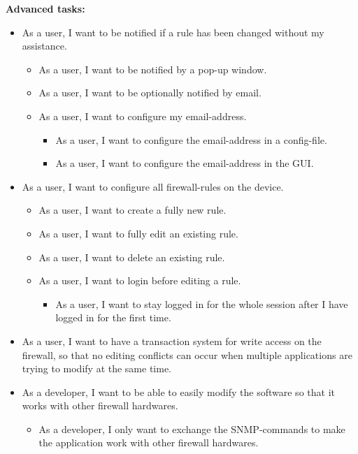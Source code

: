 \documentclass[11pt, a4paper]{article}
\begin{document}
 \textbf{Advanced tasks:}
\begin{itemize}
\item As a user, I want to be notified if a rule has been changed without my assistance.
\begin{itemize}
\item As a user, I want to be notified by a pop-up window.
\item As a user, I want to be optionally notified by email.
\item As a user, I want to configure my email-address.
\begin{itemize}
\item As a user, I want to configure the email-address in a config-file.
\item As a user, I want to configure the email-address in the GUI.
\end{itemize}
\end{itemize}
\item As a user, I want to configure all firewall-rules on the device.
\begin{itemize}
\item As a user, I want to create a fully new rule.
\item As a user, I want to fully edit an existing rule.
\item As a user, I want to delete an existing rule.
\item As a user, I want to login before editing a rule.
\begin{itemize}
\item As a user, I want to stay logged in for the whole session after I have logged in for the first time.
\end{itemize}
\end{itemize}
\item As a user, I want to have a transaction system for write access on the firewall, so that no editing conflicts can occur when multiple applications are trying to modify at the same time.
\item As a developer, I want to be able to easily modify the software so that it works with other firewall hardwares.
\begin{itemize}
\item As a developer, I only want to exchange the SNMP-commands to make the application work with other firewall hardwares.
\end{itemize}
\end{itemize}
\end{document}
